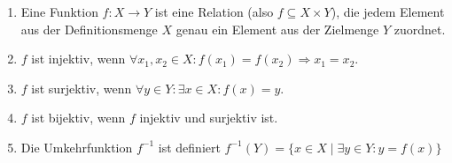 \begin{enumerate}
\begin{enumerate}
    \item Eine Funktion $f:X\to Y$ ist eine Relation (also $f\subseteq X\times Y$), die jedem Element aus der Definitionsmenge $X$ genau ein Element aus der Zielmenge $Y$ zuordnet.
    \item $f$ ist injektiv, wenn $\forall x_1,x_2\in X: f(x_1)=f(x_2) \Rightarrow x_1=x_2$.
    \item $f$ ist surjektiv, wenn $\forall y\in Y: \exists x\in X: f(x)=y$.
    \item $f$ ist bijektiv, wenn $f$ injektiv und surjektiv ist.
    \item Die Umkehrfunktion $f^{-1}$ ist definiert $f^{-1}(Y)=\{x\in X\mid\exists y\in Y: y=f(x)\}$
\end{enumerate}
\end{enumerate}
